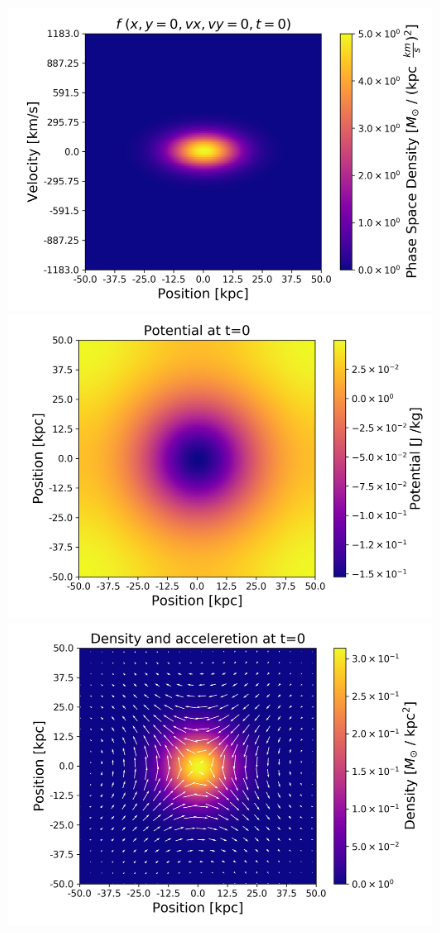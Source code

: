 \begin{figure}[h!]
    \centering
    \includegraphics[scale=0.42]{imag/2dInitPhase.png}
    \includegraphics[scale=0.42]{imag/2dInitPot.png}
    \includegraphics[scale=0.60]{imag/2dInitAcceDens.png}

\end{figure}
